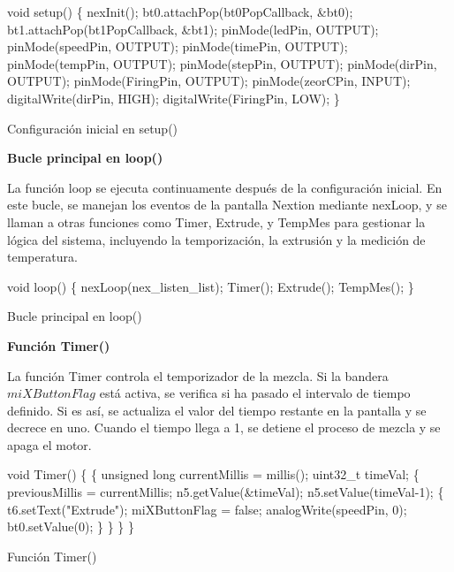 \documentclass[14pt,oneside]{extarticle} %
\begin{document}
\begin{algorithm}[H]
\SetAlgoLined

void setup() \{
    nexInit(); \;
    bt0.attachPop(bt0PopCallback, &bt0); \;
    bt1.attachPop(bt1PopCallback, &bt1); \;
    pinMode(ledPin, OUTPUT); \;
    pinMode(speedPin, OUTPUT); \;
    pinMode(timePin, OUTPUT); \;
    pinMode(tempPin, OUTPUT); \;
    pinMode(stepPin, OUTPUT); \;
    pinMode(dirPin, OUTPUT); \;
    pinMode(FiringPin, OUTPUT); \;
    pinMode(zeorCPin, INPUT); \;
    digitalWrite(dirPin, HIGH); \;
    digitalWrite(FiringPin, LOW); \;
\} \;

\caption{Configuración inicial en setup()}
\label{al:ConfiguracionInicialSetup}
\end{algorithm}

\textbf{Bucle principal en loop()}

La función loop se ejecuta continuamente después de la configuración inicial. En este bucle, se manejan los eventos de la pantalla Nextion mediante nexLoop, y se llaman a otras funciones como Timer, Extrude, y TempMes para gestionar la lógica del sistema, incluyendo la temporización, la extrusión y la medición de temperatura.

\begin{algorithm}[H]
\SetAlgoLined

void loop() \{
    nexLoop(nex\_listen\_list); \;
    Timer(); \;
    Extrude(); \;
    TempMes(); \;
\} \;

\caption{Bucle principal en loop()}
\label{al:BuclePrincipalLoop}
\end{algorithm}

\textbf{Función Timer()}

La función Timer controla el temporizador de la mezcla. Si la bandera $miXButtonFlag$ está activa, se verifica si ha pasado el intervalo de tiempo definido. Si es así, se actualiza el valor del tiempo restante en la pantalla y se decrece en uno. Cuando el tiempo llega a 1, se detiene el proceso de mezcla y se apaga el motor.

\begin{algorithm}[H]
\SetAlgoLined

void Timer() \{
     \{
        unsigned long currentMillis = millis(); \;
        uint32_t timeVal; \;
         \{
            previousMillis = currentMillis; \;
            n5.getValue(&timeVal); \;
            n5.setValue(timeVal-1); \;
             \{
                t6.setText("Extrude"); \;
                miXButtonFlag = false; \;
                analogWrite(speedPin, 0); \;
                bt0.setValue(0); \;
            \} \;
        \} \;
    \} \;
\} \;

\caption{Función Timer()}
\label{al:FuncionTimer}
\end{algorithm}
\end{document}
